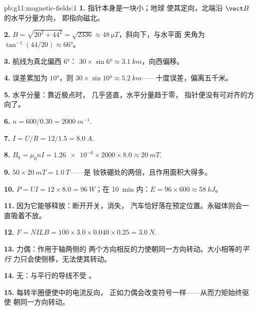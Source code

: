\begin{solution}{pb:g11:magnetic-fields:1}
\textbf{1.} 指针本身是一块小；地球
使其定向，北端沿 $\vect B$ 的水平分量方向，
即指向磁北。

\textbf{2.} $B = \sqrt{20^2 + 44^2} = \sqrt{2336} \approx
\qty{48}{\micro T}$，斜向下，与水平面
夹角为 $\tan^{-1}(44/20) \approx \ang{66}$。

\textbf{3.} 航线为真北偏西 $\ang{6}$：
$30 \times \sin\ang{6} \approx \qty{3.1}{km}$，向西偏移。

\textbf{4.} 误差累加为 $\ang{10}$，则 $30 \times \sin\ang{10} \approx
\qty{5.2}{km}$——十度误差，偏离五千米。

\textbf{5.} 水平分量：靠近极点时，
几乎竖直，水平分量趋于零，
指针便没有可对齐的方向了。

\textbf{6.} $n = 600/0.30 = \qty{2000}{m^{-1}}$.

\textbf{7.} $I = U/R = 12/1.5 = \qty{8.0}{A}$.

\textbf{8.} $B_0 = \mu_0 n I = \num{1.26e-6} \times 2000 \times 8.0
\approx \qty{20}{mT}$.

\textbf{9.} $50 \times \qty{20}{mT} = \qty{1.0}{T}$——是
钕铁硼处的两倍，且作用面积大得多。

\textbf{10.} $P = UI = 12 \times 8.0 = \qty{96}{W}$；在
\qty{10}{\minute} 内：$E = 96 \times 600 \approx \qty{58}{kJ}$。

\textbf{11.} 因为它能够释放：断开开关，消失，
汽车恰好落在预定位置。永磁体则会一直吸着不放。

\textbf{12.} $F = NILB = 100 \times 3.0 \times 0.040 \times 0.25 =
\qty{3.0}{N}$.

\textbf{13.} 力偶：作用于轴两侧的
两个方向相反的力使朝同一方向转动。大小相等的\emph{平行}
力只会使侧移，无法使其转动。

\textbf{14.} 无：与平行的导线不受
。

\textbf{15.} 每转半圈便使中的电流反向，
正如力偶会改变符号一样——从而力矩始终驱使
朝同一方向转动。


\end{solution}
